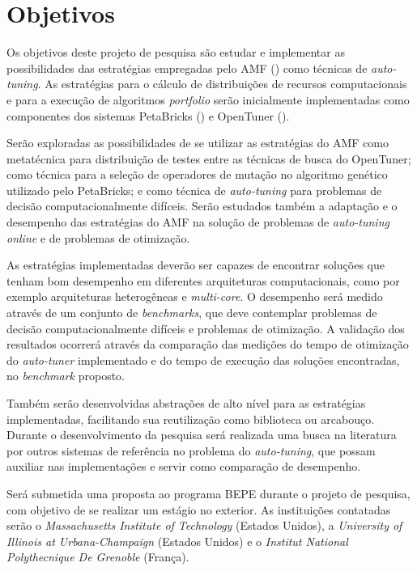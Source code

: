 \documentclass[a4paper, 12pt]{article}
\begin{document}
\section{Objetivos} \label{sec:obj}

Os objetivos deste projeto de pesquisa são estudar e implementar as
possibilidades das estratégias empregadas pelo AMF
(\citet{goldman2012framework}) como técnicas de \emph{auto-tuning}.
As estratégias para o cálculo de distribuições de recursos computacionais
e para a execução de algoritmos \emph{portfolio} serão inicialmente
implementadas como componentes dos sistemas PetaBricks (\citet{ansel2014phd}) e
OpenTuner (\citet{ansel2013opentuner}).

Serão exploradas as possibilidades de se utilizar as estratégias
do AMF como metatécnica para distribuição de testes entre as técnicas de busca
do OpenTuner; como técnica para a seleção de operadores de mutação no algoritmo
genético utilizado pelo PetaBricks; e como técnica de \emph{auto-tuning} para
problemas de decisão computacionalmente difíceis. Serão estudados também a
adaptação e o desempenho das estratégias do AMF na solução de problemas de
\emph{auto-tuning online} e de problemas de otimização.

As estratégias implementadas deverão ser capazes de encontrar soluções que
tenham bom desempenho em diferentes arquiteturas computacionais,
como por exemplo arquiteturas heterogêneas e \emph{multi-core}.
O desempenho será medido através de um conjunto de \emph{benchmarks}, que deve
contemplar problemas de decisão computacionalmente difíceis e problemas
de otimização. A validação dos resultados ocorrerá através da comparação das
medições do tempo de otimização do \emph{auto-tuner} implementado e do tempo
de execução das soluções encontradas, no \emph{benchmark} proposto.

Também serão desenvolvidas abstrações de alto nível para
as estratégias implementadas, facilitando sua reutilização como
biblioteca ou arcabouço.
Durante o desenvolvimento da pesquisa será realizada uma busca na literatura
por outros sistemas de referência no problema do \emph{auto-tuning}, que possam
auxiliar nas implementações e servir como comparação de desempenho.

Será submetida uma proposta ao programa BEPE durante o projeto de
pesquisa, com objetivo de se realizar um estágio no exterior. As
instituições contatadas serão o \emph{Massachusetts Institute of Technology}
(Estados Unidos), a \emph{University of Illinois at Urbana-Champaign}
(Estados Unidos) e o \emph{Institut National Polythecnique De Grenoble}
(França).
\end{document}
